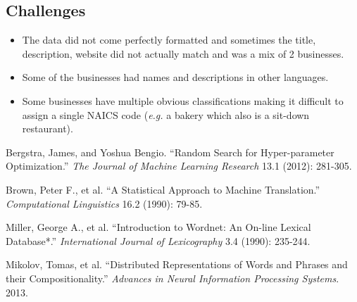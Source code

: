 \documentclass[letterpaper, 10 pt, conference]{IEEEtran}
\begin{document}
\subsection{Challenges}
\begin{itemize}

\item The data did not come perfectly formatted and sometimes the title, description, website did not actually match and was a mix of 2 businesses.
\item Some of the businesses had names and descriptions in other languages.
\item Some businesses have multiple obvious classifications making it difficult to assign a single NAICS code (\textit{e.g.} a bakery which also is a sit-down restaurant).

\end{itemize}

\begin{thebibliography}{99}

 Bergstra, James, and Yoshua Bengio. ``Random Search for Hyper-parameter Optimization.'' \textit{The Journal of Machine Learning Research} 13.1 (2012): 281-305.

 Brown, Peter F., et al. ``A Statistical Approach to Machine Translation.'' \textit{Computational Linguistics} 16.2 (1990): 79-85.

 Miller, George A., et al. ``Introduction to Wordnet: An On-line Lexical Database*.'' \textit{International Journal of Lexicography} 3.4 (1990): 235-244.

 Mikolov, Tomas, et al. ``Distributed Representations of Words and Phrases and their Compositionality.'' \textit{Advances in Neural Information Processing Systems}. 2013.

\end{thebibliography}

\addtolength{\textheight}{-12cm}   %

\newpage
\end{document}
